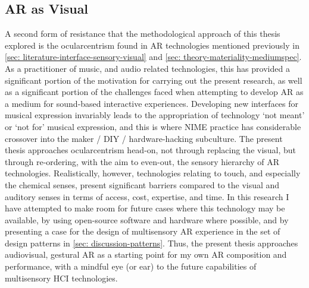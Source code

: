 \subsection{AR as Visual} \label{sec: method-resistance-ocularcentrism}
A second form of resistance that the methodological approach of this thesis explored is the ocularcentrism found in AR technologies mentioned previously in \autoref{sec: literature-interface-sensory-visual} and \autoref{sec: theory-materiality-mediumspec}. As a practitioner of music, and audio related technologies, this has provided a significant portion of the motivation for carrying out the present research, as well as a significant portion of the challenges faced when attempting to develop AR as a medium for sound-based interactive experiences. Developing new interfaces for musical expression invariably leads to the appropriation of technology `not meant' or `not for' musical expression, and this is where NIME practice has considerable crossover into the maker / DIY / hardware-hacking subculture. The present thesis approaches ocularcentrism head-on, not through replacing the visual, but through re-ordering, with the aim to even-out, the sensory hierarchy of AR technologies. Realistically, however, technologies relating to touch, and especially the chemical senses, present significant barriers compared to the visual and auditory senses in terms of access, cost, expertise, and time. In this research I have attempted to make room for future cases where this technology may be available, by using open-source software and hardware where possible, and by presenting a case for the design of multisensory AR experience in the set of design patterns in \autoref{sec: discussion-patterns}. Thus, the present thesis approaches audiovisual, gestural AR as a starting point for my own AR composition and performance, with a mindful eye (or ear) to the future capabilities of multisensory HCI technologies.

